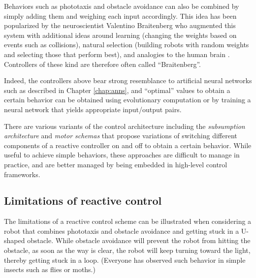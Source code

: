 Behaviors such as phototaxis and obstacle avoidance can also be combined by simply adding them and weighing each input accordingly. This idea has been popularized by the neuroscientist Valentino Braitenberg who augmented this system with additional ideas around learning (changing the weights based on events such as collisions), natural selection (building robots with random weights and selecting those that perform best), and analogies to the human brain \cite{braitenberg1986vehicles}. Controllers of these kind are therefore often called ``Braitenberg''.

Indeed, the controllers above bear strong resemblance to artificial neural networks such as described in Chapter \ref{chap:anns}, and ``optimal'' values to obtain a certain behavior can be obtained using evolutionary computation \cite{floreano1998evolutionary} or by training a neural network that yields appropriate input/output pairs. 

There are various variants of the control architecture including the \emph{subsumption architecture} \cite{brooks1990elephants} and \emph{motor schemas} \cite{arkin1989motor} that propose variations of switching different components of a reactive controller on and off to obtain a certain behavior. While useful to achieve simple behaviors, these approaches are difficult to manage in practice, and are better managed by being embedded in high-level control frameworks. 

\subsection{Limitations of reactive control}
The limitations of a reactive control scheme can be illustrated when considering a robot that combines phototaxis and obstacle avoidance and getting stuck in a U-shaped obstacle. While obstacle avoidance will prevent the robot from hitting the obstacle, as soon as the way is clear, the robot will keep turning toward the light, thereby getting stuck in a loop. (Everyone has observed such behavior in simple insects such as flies or moths.)

